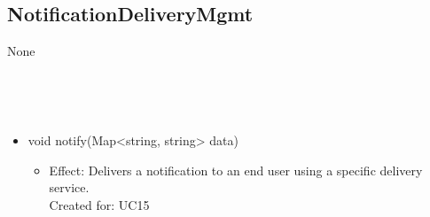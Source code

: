   \subsection{NotificationDeliveryMgmt}\label{int:NotificationDeliveryMgmt}
    \begin{description}
      \item[Provided by:] None
      \item[Required by:] \iconcomponent{}~
      \item[Operations:] ~
    \begin{itemize}[noitemsep,nolistsep,leftmargin=-.25cm]
      \item \textsf{void notify(Map\textless{}string, string\textgreater{} data)}
        \begin{itemize}[noitemsep,nolistsep]
           \item Effect: Delivers a notification to an end user using a specific delivery service. \\
Created for: UC15
        \end{itemize}
    \end{itemize}
    \end{description}


